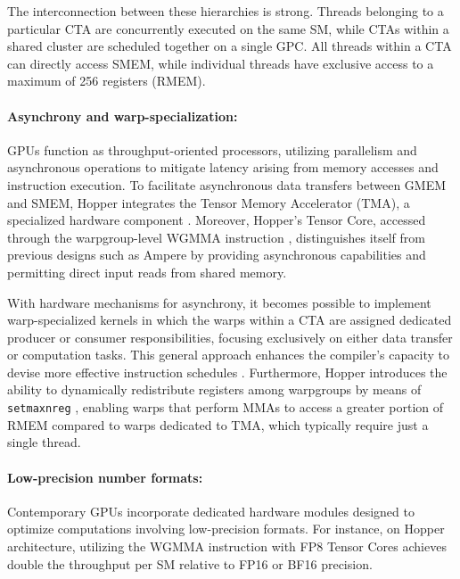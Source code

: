 The interconnection between these hierarchies is strong. Threads belonging to a particular CTA are concurrently executed on the same SM, while CTAs within a shared cluster are scheduled together on a single GPC. All threads within a CTA can directly access SMEM, while individual threads have exclusive access to a maximum of 256 registers (RMEM).

\paragraph{Asynchrony and warp-specialization:}

GPUs function as throughput-oriented processors, utilizing parallelism and asynchronous operations to mitigate latency arising from memory accesses and instruction execution. To facilitate asynchronous data transfers between GMEM and SMEM, Hopper integrates the Tensor Memory Accelerator (TMA), a specialized hardware component \cite[\S7.29]{cuda}. Moreover, Hopper’s Tensor Core, accessed through the warpgroup-level WGMMA instruction \cite[\S9.7.14]{ptx}, distinguishes itself from previous designs such as Ampere by providing asynchronous capabilities and permitting direct input reads from shared memory.

With hardware mechanisms for asynchrony, it becomes possible to implement warp-specialized kernels in which the warps within a CTA are assigned dedicated producer or consumer responsibilities, focusing exclusively on either data transfer or computation tasks. This general approach enhances the compiler’s capacity to devise more effective instruction schedules \citep{warp-specialization-2011}. Furthermore, Hopper introduces the ability to dynamically redistribute registers among warpgroups by means of \verb|setmaxnreg| \cite[\S9.7.17.1]{ptx}, enabling warps that perform MMAs to access a greater portion of RMEM compared to warps dedicated to TMA, which typically require just a single thread.

\paragraph{Low-precision number formats:}
\label{sec:low-precision-gpu}
Contemporary GPUs incorporate dedicated hardware modules designed to optimize computations involving low-precision formats. For instance, on Hopper architecture, utilizing the WGMMA instruction with FP8 Tensor Cores achieves double the throughput per SM relative to FP16 or BF16 precision.

